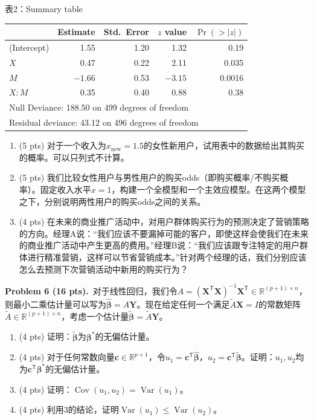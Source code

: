 \documentclass[UTF8,a4paper,11pt,fontset=fandol]{ctexart}
\newcommand{\problem}[2]{\par\addvspace{10pt}\Needspace{5\baselineskip}\textbf{Problem #1 (#2 pts).}\ }
\newcommand{\tabletitle}[1]{\par\smallskip\begin{center}#1\end{center}\vspace{-5pt}}
\newcommand{\trans}{^{\mathsf T}}
\DeclareMathOperator{\Var}{Var}
\DeclareMathOperator{\Cov}{Cov}
\begin{document}
\tabletitle{表2：Summary table}
\begin{center}
\small
\renewcommand{\arraystretch}{1.15}
\begin{tabular}{lrrrr}
\toprule
 & Estimate & Std.\ Error & $z$ value & $\Pr(>|z|)$\\
\midrule
(Intercept) & 1.55 & 1.20 & 1.32 & 0.19\\
$X$ & 0.47 & 0.22 & 2.11 & 0.035\\
$M$ & $-1.66$ & 0.53 & $-3.15$ & 0.0016\\
$X:M$ & 0.35 & 0.40 & 0.88 & 0.38\\
\midrule
\multicolumn{5}{l}{Null Deviance: 188.50 on 499 degrees of freedom}\\
\multicolumn{5}{l}{Residual deviance: 43.12 on 496 degrees of freedom}\\
\bottomrule
\end{tabular}
\end{center}
\begin{enumerate}
  \item (5 pts) 对于一个收入为$x_{\mathrm{new}}=1.5$的女性新用户，试用表中的数据给出其购买的概率。可以只列式不计算。
  \item (5 pts) 我们比较女性用户与男性用户的购买odds（即购买概率/不购买概率）。固定收入水平$x=1$，构建一个全模型和一个主效应模型。在这两个模型之下，分别说明两性用户的购买odds之间的关系。
  \item (4 pts) 在未来的商业推广活动中，对用户群体购买行为的预测决定了营销策略的方向。经理A说：“我们应该不要漏掉可能的客户，即使这样会使我们在未来的商业推广活动中产生更高的费用。”经理B说：“我们应该跟专注特定的用户群体进行精准营销，这样可以节省营销成本。”针对两个经理的话，我们分别应该怎么去预测下次营销活动中新用的购买行为？
\end{enumerate}

\problem{6}{16}对于线性回归，我们令$A=(\bm X\trans\bm X)^{-1}\bm X\trans\in\mathbb R^{(p+1)\times n}$，则最小二乘估计量可以写为$\widehat{\bm\beta}=A\bm Y$。现在给定任何一个满足$\widetilde A\bm X=I$的常数矩阵$\widetilde A\in\mathbb R^{(p+1)\times n}$，考虑一个估计量$\widetilde{\bm\beta}=\widetilde A\bm Y$。
\begin{enumerate}[label=\arabic*.]
  \item (4 pts) 证明：$\widetilde{\bm\beta}$为$\bm\beta^*$的无偏估计量。
  \item (4 pts) 对于任何常数向量$\bm c\in\mathbb R^{p+1}$，令$u_1=\bm c\trans\widehat{\bm\beta}$，$u_2=\bm c\trans\widetilde{\bm\beta}$。证明：$u_1,u_2$均为$\bm c\trans\bm\beta^*$的无偏估计量。
  \item (4 pts) 证明：$\Cov(u_1,u_2)=\Var(u_1)$。
  \item (4 pts) 利用3的结论，证明$\Var(u_1)\le\Var(u_2)$。
\end{enumerate}
\end{document}
